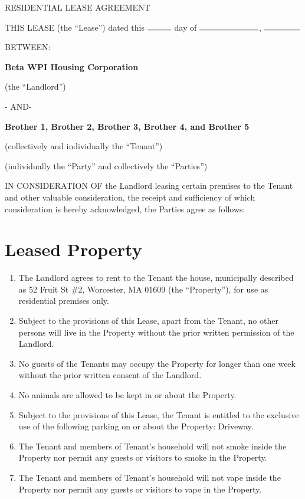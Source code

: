 \documentclass[12pt]{article}
\begin{document}
\begin{center}
RESIDENTIAL LEASE AGREEMENT
\end{center}

THIS LEASE (the ``Lease'') dated this $\rule{1cm}{0.15mm}$ day of
$\rule{2.5cm}{0.15mm}$, $\rule{1.5cm}{0.15mm}$

BETWEEN:\\

\begin{center}
\textbf{Beta WPI Housing Corporation}

(the ``Landlord'')

- AND-

\textbf{Brother 1, Brother 2, Brother 3, Brother 4, and Brother 5}

(collectively and individually the ``Tenant'')

(individually the ``Party'' and collectively the ``Parties'')
\end{center}

IN CONSIDERATION OF the Landlord leasing certain premises to the Tenant and
other valuable consideration, the receipt and sufficiency of which
consideration is hereby acknowledged, the Parties agree as follows:

\section*{Leased Property}

\begin{enumerate}

    \item The Landlord agrees to rent to the Tenant the house, municipally
	    described as 52 Fruit St \#2, Worcester, MA 01609 (the ``Property''),
		for use as residential premises only.  
    \item Subject to the provisions of this Lease, apart from the Tenant, no
	    other persons will live in the Property without the prior written
		permission of the Landlord.
    \item No guests of the Tenants may occupy the Property for longer than one
	    week without the prior written consent of the Landlord.
    \item No animals are allowed to be kept in or about the Property.
    \item Subject to the provisions of this Lease, the Tenant is entitled to
	    the exclusive use of the following parking on or about the
		Property: Driveway.
    \item The Tenant and members of Tenant's household will not smoke inside
	    the Property nor permit any guests or visitors to smoke in the
		Property.
    \item The Tenant and members of Tenant's household will not vape inside the
	    Property nor permit any guests or visitors to vape in the Property.

\end{enumerate}
    
\end{document}
